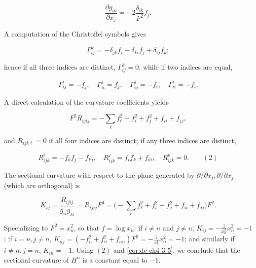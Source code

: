 $$
\frac{\partial g_{ik}}{\partial x_j}=-2\frac{\delta_{ik}}{F^2}f_j.
$$

A computation of the Christoffel symbols gives

$$
\Gamma_{ij}^k=-\delta_{jk}f_i-\delta_{ki}f_j+\delta_{ij}f_k;
$$

hence if all three indices are distinct, $\Gamma_{ij}^k=0$, while if two indices
are equal,

$$
\Gamma_{ij}^i=-f_j,\quad\Gamma_{ii}^j=f_j,\quad\Gamma_{ij}^j=-f_i,\quad\Gamma_{ii}^i=-f_i.
$$

A direct calculation of the curvature coefficients yields

$$
F^2 R_{ijij}=-\sum_\ell f_\ell^2+f_i^2+f_j^2+f_{ii}+f_{jj},
$$

and $R_{ijk\ell}=0$ if all four indices are distinct; if any three indices are
distinct,

$$
R_{ijk}^i=-f_k f_j-f_{kj},\quad R_{ijk}^j=f_i f_k+f_{ki},\quad R_{ijk}^k=0.\qquad(2)
$$

The sectional curvature with respect to the plane generated by
$\partial/\partial x_i,\partial/\partial x_j$ (which are orthogonal) is

$$
K_{ij}=\frac{R_{ijij}}{g_{ii}g_{jj}}=R_{ijij}F^4=\Big(-\sum_\ell f_\ell^2+f_i^2+f_j^2+f_{ii}+f_{jj}\Big)F^2.
$$

Specializing to $F^2=x_n^2$, so that $f=\log x_n$: if $i\neq n$ and $j\neq n$,
$K_{ij}=-\tfrac{1}{x_n^2}x_n^2=-1$; if $i=n,j\neq n$,
$K_{nj}=(-f_n^2+f_n^2+f_{nn})F^2=-\tfrac{1}{x_n^2}x_n^2=-1$; and similarly if
$i\neq n,j=n$, $K_{in}=-1$. Using $(2)$ and \cref{cor:dc-ch4-3-5}, we conclude
that the sectional curvature of $H^n$ is a constant equal to $-1$.

